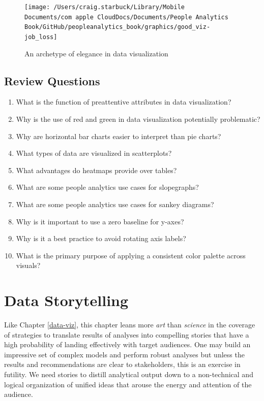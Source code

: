 \documentclass[
]{book}
\begin{document}
\begin{figure}

{\centering \texttt{[image: /Users/craig.starbuck/Library/Mobile Documents/com~apple~CloudDocs/Documents/People Analytics Book/GitHub/peopleanalytics\_book/graphics/good\_viz-job\_loss]} 

}

\caption{An archetype of elegance in data visualization}\label{fig:good-viz}
\end{figure}

\hypertarget{review-questions-13}{%
\section{Review Questions}\label{review-questions-13}}

\begin{enumerate}
\def\labelenumi{\arabic{enumi}.}
\item
  What is the function of preattentive attributes in data visualization?
\item
  Why is the use of red and green in data visualization potentially problematic?
\item
  Why are horizontal bar charts easier to interpret than pie charts?
\item
  What types of data are visualized in scatterplots?
\item
  What advantages do heatmaps provide over tables?
\item
  What are some people analytics use cases for slopegraphs?
\item
  What are some people analytics use cases for sankey diagrams?
\item
  Why is it important to use a zero baseline for y-axes?
\item
  Why is it a best practice to avoid rotating axis labels?
\item
  What is the primary purpose of applying a consistent color palette across visuals?
\end{enumerate}

\hypertarget{storytelling}{%
\chapter{Data Storytelling}\label{storytelling}}

Like Chapter \ref{data-viz}, this chapter leans more \emph{art} than \emph{science} in the coverage of strategies to translate results of analyses into compelling stories that have a high probability of landing effectively with target audiences. One may build an impressive set of complex models and perform robust analyses but unless the results and recommendations are clear to stakeholders, this is an exercise in futility. We need stories to distill analytical output down to a non-technical and logical organization of unified ideas that arouse the energy and attention of the audience.
\end{document}
